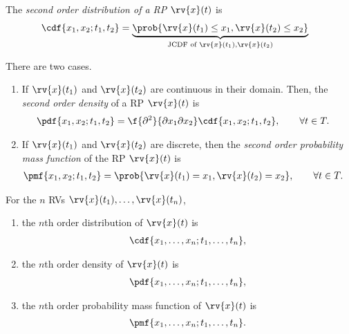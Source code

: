 \begin{mydefinition}
    The \emph{second order distribution of a RP} $\rv{x}(t)$ is
    \begin{align}
        \cdf{x_{1}, x_{2}; t_{1}, t_{2}} &= \underbrace{\prob{\rv{x}(t_{1}) \leq x_{1}, \rv{x}(t_{2})\leq x_{2}}}_{\text{JCDF of } \rv{x}(t_{1}), \rv{x}(t_{2})}
    \end{align}
\end{mydefinition}
\begin{mydefinition}
    There are two cases.
    \begin{enumerate}
        \item If $\rv{x}(t_{1})$ and $\rv{x}(t_{2})$ are continuous in their domain. Then, the \emph{second order density} of a RP $\rv{x}(t)$ is 
        \begin{align}
            \pdf{x_{1}, x_{2}; t_{1}, t_{2}} &= \f{\partial^{2}}{\partial x_{1}\partial x_{2}} \cdf{x_{1}, x_{2}; t_{1}, t_{2}}, \qquad \forall t\in T.
        \end{align}

        \item If $\rv{x}(t_{1})$ and $\rv{x}(t_{2})$ are discrete, then the \emph{second order probability mass function} of the RP $\rv{x}(t)$ is
        \begin{align}
            \pmf{x_{1}, x_{2}; t_{1}, t_{2}} &= \prob{\rv{x}(t_{1}) = x_{1}, \rv{x}(t_{2}) = x_{2}}, \qquad \forall t\in T.
        \end{align}
    \end{enumerate}
\end{mydefinition}

\begin{mydefinition}
    For the $n$ RVs $\rv{x}(t_{1}), \ldots, \rv{x}(t_{n})$, 
    \begin{enumerate}
        \item the $n$th order distribution of $\rv{x}(t)$ is 
        \begin{align}
            \cdf{x_{1},\ldots, x_{n}; t_{1}, \ldots, t_{n}},
        \end{align}
        \item the $n$th order density of $\rv{x}(t)$ is
        \begin{align}
            \pdf{x_{1},\ldots, x_{n}; t_{1}, \ldots, t_{n}},
        \end{align}
        \item the $n$th order probability mass function of $\rv{x}(t)$ is         
        \begin{align}
            \pmf{x_{1}, \ldots, x_{n}; t_{1}, \ldots, t_{n}}.
        \end{align}
    \end{enumerate}
\end{mydefinition}

